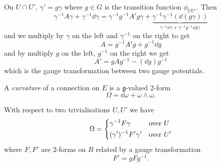 \documentclass[a4paper,11pt]{article}
\begin{document}
    On $U \cap U'$, $\gamma' = g \gamma$ where $g \in G$ is the transition function $\phi_{U U'}$. Then 
    \begin{equation}
        \gamma^{-1} A \gamma + \gamma^{-1} \dd{\gamma} = \gamma^{-1} g^{-1} A' g \gamma + \underbrace{\gamma^{-1} \gamma^{-1} \left( \dd{(g \gamma)} \right)}_{\gamma^{-1} \dd{\gamma} + \gamma^{-1} g^{-1} \dd{g} \gamma}
    \end{equation}
    and we multiply by $\gamma$ on the left and $\gamma^{-1}$ on the right to get 
    \begin{equation}
        A = g^{-1} A' g + g^{-1} \dd{g} 
    \end{equation}
    and by multiply $g$ on the left, $g^{-1}$ on the right we get 
    \begin{equation}
        \boxed{A' = g A g^{-1} - (\dd{g})g^{-1}} \label{eq:conn-gauge-tfm}
    \end{equation}
    which is the gauge transformation between two gauge potentials. 

    \begin{defi}[Curvature]
        A \emph{curvature} of a connection on $E$ is a $\mathfrak{g}$-valued 2-form 
        \begin{equation}
            \Omega = \dd{\omega} + \omega \wedge \omega.
        \end{equation}
    \end{defi}

    With respect to two trivialisations $U, U'$ we have 
    \begin{equation}
        \Omega = \begin{dcases}
            \gamma^{-1} F \gamma & \text{over }U\\
            (\gamma')^{-1} F' \gamma' & \text{over }U'
        \end{dcases}
    \end{equation}
    where $F, F'$ are 2-forms on $B$ related by a gauge transformation 
    \begin{equation}
        F' = g F g^{-1}. \label{eq:curv-gauge-tfm}
    \end{equation}





    


    

\end{document}
